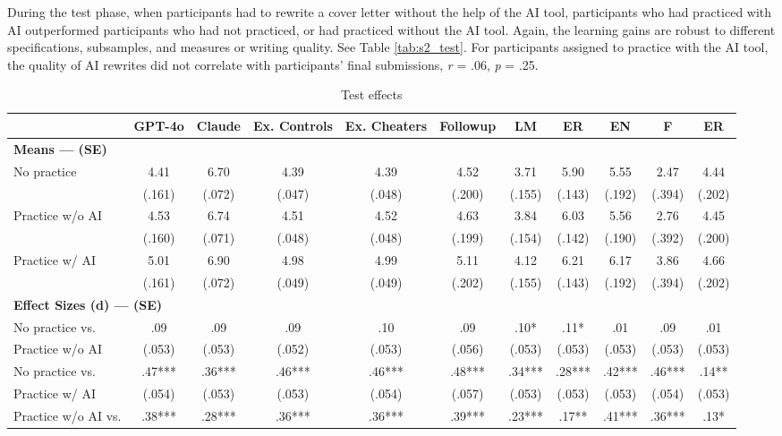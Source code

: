 \documentclass[11pt]{report}
\begin{document}
\begin{append}
During the test phase, when participants had to rewrite a cover letter without the help of the AI tool, participants who had practiced with AI outperformed participants who had not practiced, or had practiced without the AI tool. Again, the learning gains are robust to different specifications, subsamples, and measures or writing quality. See Table \ref{tab:s2_test}.
For participants assigned to practice with the AI tool, the quality of AI rewrites did not correlate with participants' final submissions, \textit{r} = .06, \textit{p} = .25.

\begin{table}[h]
    \centering
    \footnotesize
    \caption{Test effects}
\begin{tabular}{lcccccccccc}
\toprule
  & GPT-4o & Claude & Ex. Controls & Ex. Cheaters & Followup & LM & ER & EN & F & ER \\ 
\midrule
\multicolumn{11}{l}{\textbf{Means --- (SE)}} \\ 
\midrule
No practice & 4.41 & 6.70 & 4.39 & 4.39 & 4.52 & 3.71 & 5.90 & 5.55 & 2.47 & 4.44 \\ 
 & (.161) & (.072) & (.047) & (.048) & (.200) & (.155) & (.143) & (.192) & (.394) & (.202) \\ 
Practice w/o AI & 4.53 & 6.74 & 4.51 & 4.52 & 4.63 & 3.84 & 6.03 & 5.56 & 2.76 & 4.45 \\ 
 & (.160) & (.071) & (.048) & (.048) & (.199) & (.154) & (.142) & (.190) & (.392) & (.200) \\ 
Practice w/ AI & 5.01 & 6.90 & 4.98 & 4.99 & 5.11 & 4.12 & 6.21 & 6.17 & 3.86 & 4.66 \\ 
 & (.161) & (.072) & (.049) & (.049) & (.202) & (.155) & (.143) & (.192) & (.394) & (.202) \\ 
\midrule
\multicolumn{11}{l}{\textbf{Effect Sizes (d) --- (SE)}} \\ 
\midrule
No practice vs.  & .09 & .09 & .09 & .10 & .09 & .10* & .11* & .01 & .09 & .01 \\ 
 Practice w/o AI& (.053) & (.053) & (.052) & (.053) & (.056) & (.053) & (.053) & (.053) & (.053) & (.053) \\ 
No practice vs.  & .47*** & .36*** & .46*** & .46*** & .48*** & .34*** & .28*** & .42*** & .46*** & .14** \\ 
 Practice w/ AI& (.054) & (.053) & (.053) & (.054) & (.057) & (.053) & (.053) & (.053) & (.054) & (.053) \\ 
Practice w/o AI vs.  & .38*** & .28*** & .36*** & .36*** & .39*** & .23*** & .17** & .41*** & .36*** & .13* \\ 

\end{tabular}
\end{table}
\end{append}
\end{document}
